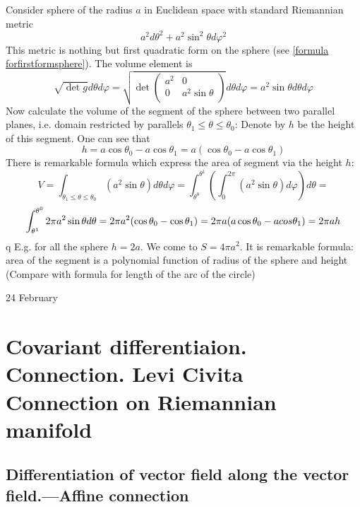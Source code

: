 \documentclass[12pt]{article}
\theoremstyle{theorem}
\numberwithin{equation}{section}
\begin{document}
    Consider sphere of the radius $a$ in Euclidean space with standard Riemannian metric
                       $$
            a^2 d\theta^2+a^2\sin^2\theta d\varphi^2
                       $$
  This metric is nothing but first quadratic form   on the sphere (see \eqref{formula forfirstformsphere}).
   The volume element is
                             $$
           \sqrt {\det g}d\theta  d\varphi=
         \sqrt
           {
         \det
         \left(
    \begin{array}{cc}
  a^2 & 0 \\
  0&  a^2\sin \theta \\
\end{array}
\right)}d\theta d\varphi=a^2\sin \theta d\theta d\varphi
                             $$
 Now calculate the volume of the segment of the sphere between two parallel planes,
 i.e. domain restricted  by parallels $\theta_1\leq \theta \leq \theta_0$:
   Denote by  $h$ be the height of this segment. One can see that
                 $$
               h=a\cos\theta_0-a\cos\theta_1=a(\cos\theta_0-a\cos \theta_1)
                $$
   There is remarkable formula which express the area of segment via the height $h$:
       $$
   V= \int_{\theta_1\leq \theta \leq \theta_0}\left (a^2\sin \theta \right)d\theta d\varphi=
         \int_{\theta^0}^{\theta^1}\left(\int_0^{2\pi}\left(a^2\sin \theta\right) d\varphi\right)d\theta=
                $$
\begin{equation}\label{areaoftheseqment}
       \int_{\theta^1}^{\theta^0} 2\pi a^2\sin\theta d\theta=2\pi a^2 (\cos \theta_0-\cos\theta_1)=
            2\pi a (a\cos \theta_0-a\\cos \theta_1)=2\pi a h
\end{equation}
q E.g. for all the sphere $h=2a$. We come to $S=4\pi a^2$.
It is remarkable formula: area of the segment is a polynomial function of radius of the sphere
 and height (Compare with formula for length of the arc of the circle)

24 February



\section {Covariant differentiaion. Connection. Levi Civita  Connection on Riemannian manifold}

\subsection {Differentiation of vector field along the vector field.---Affine connection}
\end{document}
